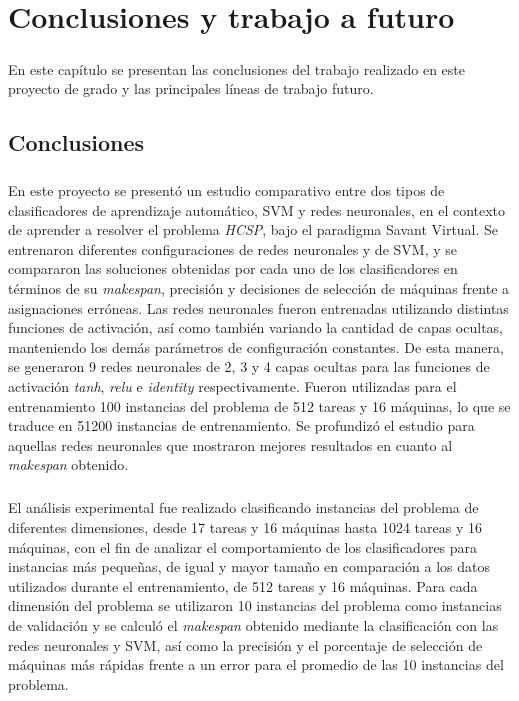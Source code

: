 \chapter{Conclusiones y trabajo a futuro} \label{section-conclusiones}

\paragraph{}En este capítulo se presentan las conclusiones del trabajo realizado en este proyecto de grado y las principales líneas de trabajo futuro.

\section{Conclusiones}

\paragraph{}En este proyecto se presentó un estudio comparativo entre dos tipos de clasificadores de aprendizaje automático, SVM y redes neuronales, en el contexto de aprender a resolver el problema \textit{HCSP}, bajo el paradigma Savant Virtual.
Se entrenaron diferentes configuraciones de redes neuronales y de SVM, y se compararon las soluciones obtenidas por cada uno de los clasificadores en términos de su \textit{makespan}, precisión y decisiones de selección de máquinas frente a asignaciones erróneas.
Las redes neuronales fueron entrenadas utilizando distintas funciones de activación, así como también variando la cantidad de capas ocultas, manteniendo los demás parámetros de configuración constantes.
De esta manera, se generaron 9 redes neuronales de 2, 3 y 4 capas ocultas para las funciones de activación \textit{tanh}, \textit{relu} e \textit{identity} respectivamente.
Fueron utilizadas para el entrenamiento 100 instancias del problema de 512 tareas y 16 máquinas, lo que se traduce en 51200 instancias de entrenamiento.
Se profundizó el estudio para aquellas redes neuronales que mostraron mejores resultados en cuanto al \textit{makespan} obtenido.

\paragraph{}El análisis experimental fue realizado clasificando instancias del problema de diferentes dimensiones, desde 17 tareas y 16 máquinas hasta 1024 tareas y 16 máquinas, con el fin de analizar el comportamiento de los clasificadores para instancias más pequeñas, de igual y mayor tamaño en comparación a los datos utilizados durante el entrenamiento, de 512 tareas y 16 máquinas.
Para cada dimensión del problema se utilizaron 10 instancias del problema como instancias de validación y se calculó el \textit{makespan} obtenido mediante la clasificación con las redes neuronales y SVM, así como la precisión y el porcentaje de selección de máquinas más rápidas frente a un error para el promedio de las 10 instancias del problema.

